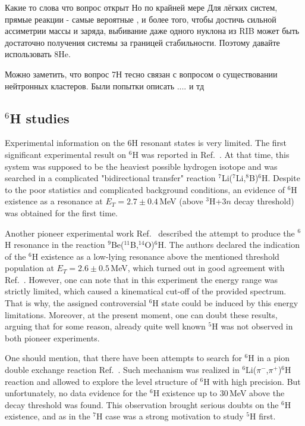 Какие то слова что вопрос открыт
Но по крайней мере Для лёгких систем, прямые реакции - самые вероятные , и более того, чтобы достичь сильной ассиметрии массы и заряда, выбивание даже одного нуклона из RIB может быть достаточно получения системы за границей стабильности. Поэтому давайте использовать 8He. 

Можно заметить, что вопрос 7Н тесно связан с вопросом о существовании нейтронных кластеров. Были попытки описать .... и тд

\subsection{$^{6}$H studies}

Experimental information on the 6H resonant states is very limited.
The first significant experimental result on $^{6}$H was reported in Ref.\ \cite{Aleksandrov:1984}.
At that time, this system was supposed to be the heaviest possible hydrogen isotope and was searched in a complicated "bidirectional transfer" reaction $^7$Li($^7$Li,$^8$B)$^6$H.
Despite to the poor statistics and complicated background conditions, an evidence of $^{6}$H existence as a resonance at $E_T= 2.7\pm 0.4$\,MeV (above $^3$H+$3n$ decay threshold) was obtained for the first time.

Another pioneer experimental work Ref.\ \cite{Belozyorov:1986} described the attempt to produce the $^{6}$H resonance in the reaction $^9$Be($^{11}$B,$^{14}$O)$^6$H.
The authors declared the indication of the $^{6}$H existence as a low-lying resonance above the mentioned threshold population at $E_T= 2.6\pm 0.5$\,MeV, which turned out in good agreement with Ref.\ \cite{Aleksandrov:1984}.
However, one can note that in this experiment the energy range was strictly limited, which caused a kinematical cut-off of the provided spectrum.
That is why, the assigned controversial $^{6}$H state could be induced by this energy limitations.
Moreover, at the present moment, one can doubt these results, arguing that for some reason, already quite well known $^{5}$H was not observed in both pioneer experiments.

One should mention, that there have been attempts to search for $^{6}$H in a pion double exchange reaction Ref.\ \cite{PARKER:1990483}.
Such mechanism was realized in $^6$Li($\pi ^{-}$,$\pi ^{+}$)$^{6}$H reaction and allowed to explore the level
structure of $^{6}$H with high precision. 
But unfortunately, no data evidence for the $^{6}$H existence up to 30\,MeV above the decay threshold was found.
This observation brought serious doubts on the $^{6}$H existence, and as in the $^{7}$H case was a strong motivation to study $^{5}$H first.

